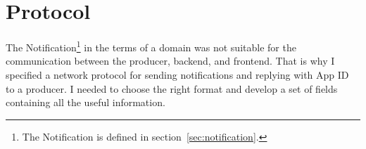 \section{Protocol}\label{sec:protocol}

The Notification\footnote{
  The Notification is defined in section~\ref{sec:notification}.
} in the terms of a domain
was not suitable for the communication
between the producer, backend, and frontend.
That is why I specified a network protocol
for sending notifications
and replying with App ID to a producer.
I needed to choose the right format
and develop a set of fields
containing all the useful information.



